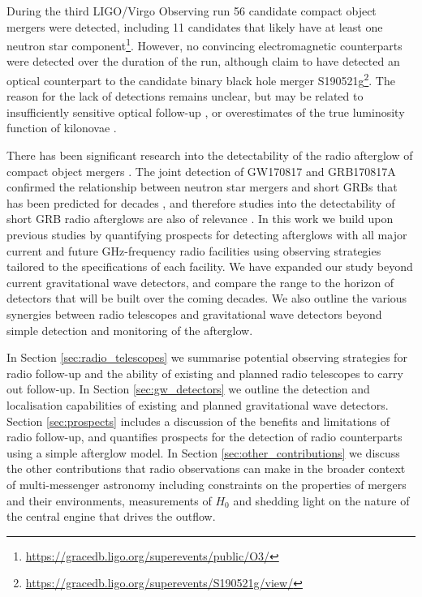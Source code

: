 During the third LIGO/Virgo Observing run 56 candidate compact object mergers were detected, including 11 candidates that likely have at least one neutron star component\footnote{\url{https://gracedb.ligo.org/superevents/public/O3/}}. However, no convincing electromagnetic counterparts were detected over the duration of the run, although \citet{2020arXiv200614122G} claim to have detected an optical counterpart to the candidate binary black hole merger S190521g\footnote{\url{https://gracedb.ligo.org/superevents/S190521g/view/}}. The reason for the lack of detections remains unclear, but may be related to insufficiently sensitive optical follow-up \citep{2020arXiv200614756C}, or overestimates of the true luminosity function of kilonovae \citep{2020arXiv200611306K}.

\pagebreak

There has been significant research into the detectability of the radio afterglow of compact object mergers \citep[e.g.][]{2014arXiv1405.6219F,2016ApJ...831..190H,2017MNRAS.471.1652L,2019A&A...631A..39D,2019MNRAS.488.2405G,2020arXiv200508112L}. The joint detection of GW170817 and GRB170817A confirmed the relationship between neutron star mergers and short GRBs \citep{2019MNRAS.483..840B,2019ApJ...880L..23W} that has been predicted for decades \citep{1989Natur.340..126E,1992ApJ...395L..83N}, and therefore studies into the detectability of short GRB radio afterglows are also of relevance \citep[e.g.][]{2013MNRAS.435.2543G,2014PASA...31...22G,2015ApJ...806..224M,2015RAA....15..237Z}. In this work we build upon previous studies by quantifying prospects for detecting afterglows with all major current and future GHz-frequency radio facilities using observing strategies tailored to the specifications of each facility. We have expanded our study beyond current gravitational wave detectors, and compare the range to the horizon of detectors that will be built over the coming decades. We also outline the various synergies between radio telescopes and gravitational wave detectors beyond simple detection and monitoring of the afterglow.

In Section \ref{sec:radio_telescopes} we summarise potential observing strategies for radio follow-up and the ability of existing and planned radio telescopes to carry out follow-up. In Section \ref{sec:gw_detectors} we outline the detection and localisation capabilities of existing and planned gravitational wave detectors. Section \ref{sec:prospects} includes a discussion of the benefits and limitations of radio follow-up, and quantifies prospects for the detection of radio counterparts using a simple afterglow model. In Section \ref{sec:other_contributions} we discuss the other contributions that radio observations can make in the broader context of multi-messenger astronomy including constraints on the properties of mergers and their environments, measurements of $H_0$ and shedding light on the nature of the central engine that drives the outflow.





